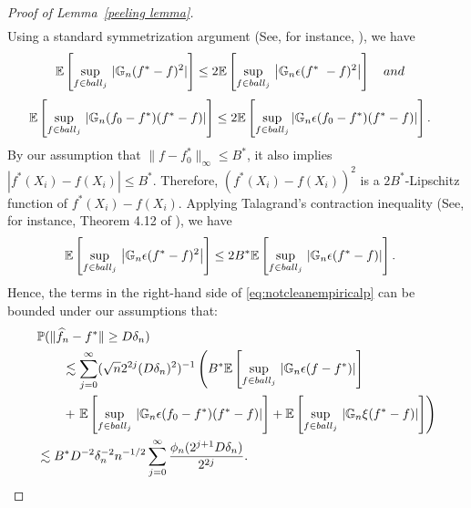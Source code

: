 \documentclass[12pt]{article}
\begin{document}
\begin{appendices}
\begin{proof}[Proof of Lemma~\ref{peeling lemma}]
\begin{equation}
\begin{aligned}
\end{aligned}
\end{equation}
Using a standard symmetrization argument (See, for instance, \cite[Section 3.3]{sen2018gentle}), we have
\begin{equation}\nonumber
\begin{aligned}
        & \mathbb{E}\left[\sup_{ f\in {\rm ball}_j}\, |\mathbb{G}_n(f^* - f)^2|\right] \leq 2\mathbb{E}\left[\sup_{ f\in {\rm ball}_j}\, \left|\mathbb{G}_n \epsilon (f^*\ - f)^2\right|\right]\quad \textrm{and} \nonumber
\end{aligned}
\end{equation}
\begin{align}
        & \mathbb{E}\left[\sup_{ f\in {\rm ball}_j}\, |\mathbb{G}_n(f_0 - f^*)(f^* - f)|\right] \leq 2\mathbb{E}\left[\sup_{ f\in {\rm ball}_j}\left|\mathbb{G}_n \epsilon (f_0 - f^*)(f^* - f)\right|\right].\nonumber
\end{align}
By our assumption that $\|f-f^*_0\|_\infty \le B^*$, it also implies $|f^*(X_i) - f(X_i)| \leq B^*$. Therefore, $(f^*(X_i) - f(X_i))^2$ is a $2B^*$-Lipschitz function of $f^*(X_i) - f(X_i)$. Applying Talagrand’s contraction inequality (See, for instance, Theorem 4.12 of \cite{ledoux1991probability}), we have
\begin{equation}
\begin{aligned}\nonumber
        &\mathbb{E}\left[\sup_{ f\in {\rm ball}_j} \,\left|\mathbb{G}_n \epsilon (f^* - f)^2\right|\right] \le 2B^*\mathbb{E}\left[\sup_{ f\in {\rm ball}_j} \,\left|\mathbb{G}_n \epsilon (f^* - f)\right|\right].
\end{aligned}
\end{equation}
Hence, the terms in the right-hand side of \eqref{eq:notcleanempiricalp} can be bounded under our assumptions that:
\begin{equation}
    \begin{aligned}
      &\mathbb{P}(\|\widehat f_n - f^*\|\geq D\delta_n) \\
     & \qquad \lesssim \sum_{j=0}^{\infty}(\sqrt{n}2^{2j}(D\delta_n)^2)^{-1}\left( B^*\mathbb{E}\left[\sup_{ f\in {\rm ball}_j}\, \left|\mathbb{G}_n\epsilon(f - f^*)\right|\right] \right.\\ 
     & \qquad +\left.\mathbb{E}\left[\sup_{ f\in {\rm ball}_j} \,\left|\mathbb{G}_n\epsilon(f_0 - f^*)(f^* - f)\right|\right] +\mathbb{E}\left[\sup_{ f\in {\rm ball}_j}\,\left|\mathbb{G}_n\xi(f^* - f)\right|\right] \right)\\
     & \lesssim B^*D^{-2}\delta_n^{-2}n^{-1/2}\sum_{j=0}^{\infty}\frac{\phi_n(2^{j+1}D\delta_n)}{2^{2j}}.
    \end{aligned}
\end{equation}
\end{proof}


\end{appendices}
\end{document}
